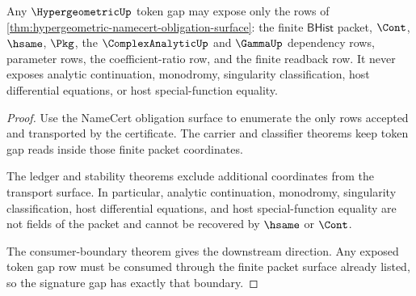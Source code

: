 \begin{theorem}
\label{thm:hypergeometric-signature-gap-boundary}
Any $\HypergeometricUp$ token gap may expose only the rows of
\autoref{thm:hypergeometric-namecert-obligation-surface}: the finite
$\mathsf{BHist}$ packet, $\Cont$, $\hsame$, $\Pkg$, the
$\ComplexAnalyticUp$ and $\GammaUp$ dependency rows, parameter rows, the
coefficient-ratio row, and the finite readback row. It never exposes analytic
continuation, monodromy, singularity classification, host differential
equations, or host special-function equality.
\end{theorem}
\begin{proof}
Use the NameCert obligation surface to enumerate the only rows accepted and
transported by the certificate. The carrier and classifier theorems keep token
gap reads inside those finite packet coordinates.

The ledger and stability theorems exclude additional coordinates from the
transport surface. In particular, analytic continuation, monodromy, singularity
classification, host differential equations, and host special-function equality
are not fields of the packet and cannot be recovered by $\hsame$ or $\Cont$.

The consumer-boundary theorem gives the downstream direction. Any exposed token
gap row must be consumed through the finite packet surface already listed, so
the signature gap has exactly that boundary.
\end{proof}

